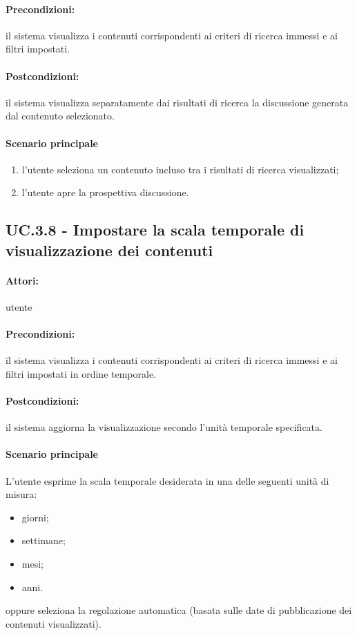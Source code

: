 \documentclass[10pt,a4paper,headinclude,footinclude,hidelinks]{scrreprt} %
\begin{document}
	\paragraph{Precondizioni:} il sistema visualizza i contenuti corrispondenti ai criteri di ricerca immessi e ai filtri impostati.
	\paragraph{Postcondizioni:} il sistema visualizza separatamente dai risultati di ricerca la discussione generata dal contenuto selezionato.
	\paragraph{Scenario principale}
	\begin{enumerate}
	\item l'utente seleziona un contenuto incluso tra i risultati di ricerca visualizzati;
	\item l'utente apre la prospettiva discussione.
	\end{enumerate}

	\subsection[UC.3.7]{UC.3.8 - Impostare la scala temporale di visualizzazione dei contenuti}
	\label{sec:stage:ar:uc:3_}
	\paragraph{Attori:} utente
	\paragraph{Precondizioni:} il sistema visualizza i contenuti corrispondenti ai criteri di ricerca immessi e ai filtri impostati in ordine temporale.
	\paragraph{Postcondizioni:} il sistema aggiorna la visualizzazione secondo l'unità temporale specificata.
	\paragraph{Scenario principale}
	L'utente esprime la scala temporale desiderata in una delle seguenti unità di misura:
	\begin{itemize}
	\item giorni;
	\item settimane;
	\item mesi;
	\item anni.
	\end{itemize}
	oppure seleziona la regolazione automatica (basata sulle date di pubblicazione dei contenuti visualizzati).
\end{document}
